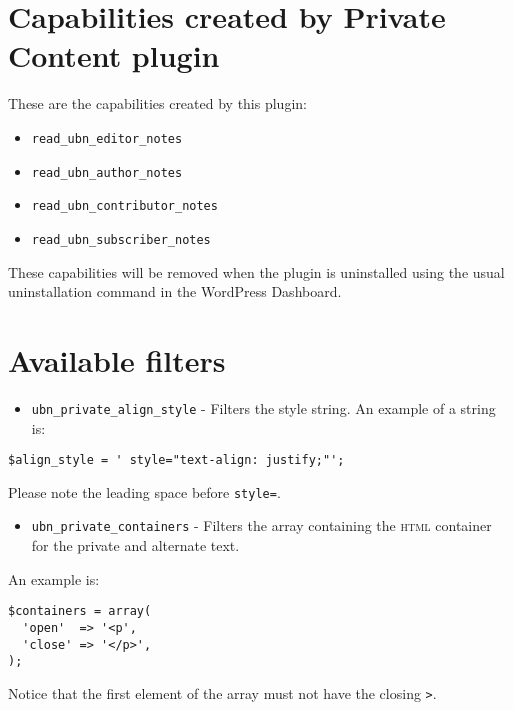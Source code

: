 \documentclass[a4paper,10pt]{article}
\begin{document}
\section{Capabilities created by Private Content plugin}

These are the capabilities created by this plugin:

\begin{itemize}
 \item \verb+read_ubn_editor_notes+
 \item \verb+read_ubn_author_notes+
 \item \verb+read_ubn_contributor_notes+
 \item \verb+read_ubn_subscriber_notes+
\end{itemize}

These capabilities will be removed when the plugin is uninstalled using the usual uninstallation command in the WordPress Dashboard.

\section{Available filters}

\begin{itemize}
 \item \verb+ubn_private_align_style+ - Filters the style string. An example of a string is:
\end{itemize}

\begin{lstlisting}
$align_style = ' style="text-align: justify;"';
\end{lstlisting}

Please note the leading space before \verb+style=+.

\begin{itemize}
 \item \verb+ubn_private_containers+ - Filters the array containing the \textsc{html} container for the private and alternate text.
\end{itemize}

An example is:

\begin{lstlisting}
$containers = array(
  'open'  => '<p',
  'close' => '</p>',
);
\end{lstlisting}

Notice that the first element of the array must not have the closing \verb+>+.
\end{document}
